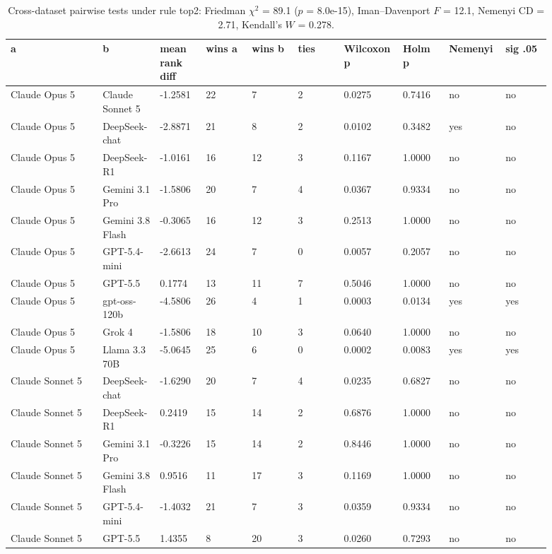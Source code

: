 \begin{landscape}
\tiny
\setlength{\tabcolsep}{3pt}
\begin{longtable}{p{0.162\linewidth}p{0.081\linewidth}p{0.081\linewidth}p{0.081\linewidth}p{0.081\linewidth}p{0.081\linewidth}p{0.081\linewidth}p{0.081\linewidth}p{0.081\linewidth}p{0.081\linewidth}}
\caption{Cross-dataset pairwise tests under rule top2: Friedman $\chi^2$ = 89.1 ($p$ = 8.0e-15), Iman--Davenport $F$ = 12.1, Nemenyi CD = 2.71, Kendall's $W$ = 0.278.}\label{tab:pairwise_top2}\\
\toprule
a & b & mean rank diff & wins a & wins b & ties & Wilcoxon p & Holm p & Nemenyi & sig .05 \\
\midrule
Claude Opus 5 & Claude Sonnet 5 & -1.2581 & 22 & 7 & 2 & 0.0275 & 0.7416 & no & no \\
Claude Opus 5 & DeepSeek-chat & -2.8871 & 21 & 8 & 2 & 0.0102 & 0.3482 & yes & no \\
Claude Opus 5 & DeepSeek-R1 & -1.0161 & 16 & 12 & 3 & 0.1167 & 1.0000 & no & no \\
Claude Opus 5 & Gemini 3.1 Pro & -1.5806 & 20 & 7 & 4 & 0.0367 & 0.9334 & no & no \\
Claude Opus 5 & Gemini 3.8 Flash & -0.3065 & 16 & 12 & 3 & 0.2513 & 1.0000 & no & no \\
Claude Opus 5 & GPT-5.4-mini & -2.6613 & 24 & 7 & 0 & 0.0057 & 0.2057 & no & no \\
Claude Opus 5 & GPT-5.5 & 0.1774 & 13 & 11 & 7 & 0.5046 & 1.0000 & no & no \\
Claude Opus 5 & gpt-oss-120b & -4.5806 & 26 & 4 & 1 & 0.0003 & 0.0134 & yes & yes \\
Claude Opus 5 & Grok 4 & -1.5806 & 18 & 10 & 3 & 0.0640 & 1.0000 & no & no \\
Claude Opus 5 & Llama 3.3 70B & -5.0645 & 25 & 6 & 0 & 0.0002 & 0.0083 & yes & yes \\
Claude Sonnet 5 & DeepSeek-chat & -1.6290 & 20 & 7 & 4 & 0.0235 & 0.6827 & no & no \\
Claude Sonnet 5 & DeepSeek-R1 & 0.2419 & 15 & 14 & 2 & 0.6876 & 1.0000 & no & no \\
Claude Sonnet 5 & Gemini 3.1 Pro & -0.3226 & 15 & 14 & 2 & 0.8446 & 1.0000 & no & no \\
Claude Sonnet 5 & Gemini 3.8 Flash & 0.9516 & 11 & 17 & 3 & 0.1169 & 1.0000 & no & no \\
Claude Sonnet 5 & GPT-5.4-mini & -1.4032 & 21 & 7 & 3 & 0.0359 & 0.9334 & no & no \\
Claude Sonnet 5 & GPT-5.5 & 1.4355 & 8 & 20 & 3 & 0.0260 & 0.7293 & no & no \\

\end{longtable}
\end{landscape}
